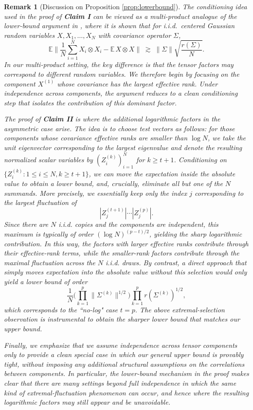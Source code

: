 \documentclass[numbers,webpdf,imaiai]{ima-authoring-template}
\theoremstyle{thmstyletwo}%
\newtheorem{remark}{Remark}%
\numberwithin{equation}{section}
\numberwithin{equation}{section}
\newcommand{\E}{\mathbb{E}}
\begin{document}
\begin{remark}[Discussion on Proposition \ref{prop:lowerbound}]\label{rem:lower_bound}
The conditioning idea used in the proof of \emph{\textbf{Claim I}} can be viewed as a multi-product analogue of the lower-bound argument in \cite[Theorem~4]{koltchinskii2017concentration}, where it is shown that for i.i.d.\ centered Gaussian random variables $X,X_1,\ldots,X_N$ with covariance operator $\Sigma$,
\[
\E \bigg\|\frac{1}{N}\sum_{i=1}^{N} X_i \otimes X_i- \E\, X \otimes X\bigg\|
\;\gtrsim\;
\|\Sigma\|\sqrt{\frac{r(\Sigma)}{N}}.
\]
In our multi-product setting, the key difference is that the tensor factors may correspond to different random variables. We therefore begin by focusing on the component $X^{(1)}$ whose covariance has the largest effective rank. Under independence across components, the argument reduces to a clean conditioning step that isolates the contribution of this dominant factor.

The proof of \emph{\textbf{Claim II}} is where the additional logarithmic factors in the asymmetric case arise. The idea is to choose test vectors as follows: for those components whose covariance effective ranks are smaller than $\log N$, we take the unit eigenvector corresponding to the largest eigenvalue and denote the resulting normalized scalar variables by $(Z_i^{(k)})_{i=1}^{N}$ for $ k\ge t+1$. Conditioning on $\{Z_i^{(k)}:1\le i\le N,k\ge t+1\}$, we can move the expectation inside the absolute value to obtain a lower bound, and, crucially, eliminate all but one of the $N$ summands. More precisely, we essentially keep only the index $j$ corresponding to the largest fluctuation of
\[
|Z_j^{(t+1)}|\cdots |Z_j^{(p)}|.
\]
Since there are  $N$ i.i.d. copies and the components are independent, this maximum is typically of order $(\log N)^{(p-t)/2}$, yielding the sharp logarithmic contribution. In this way, the factors with larger effective ranks contribute through their effective-rank terms, while the smaller-rank factors contribute through the maximal fluctuation across the $N$ i.i.d. draws. By contrast, a direct approach that simply moves expectation into the absolute value without this selection would only yield a lower bound of order
\[
\frac{1}{N}\bigg(\prod_{k=1}^p\|\Sigma^{(k)}\|^{1/2}\bigg)\prod_{k=1}^{p} r(\Sigma^{(k)})^{1/2},
\]
which corresponds to the ``no-log" case $t=p$. The above extremal-selection observation is instrumental to obtain the sharper lower bound that matches our upper bound.

Finally, we emphasize that we assume independence across tensor components only to provide a clean special case in which our general upper bound is provably tight, without imposing any additional structural assumptions on the correlations between components. In particular, the lower-bound mechanism in the proof makes clear that there are many settings beyond full independence in which the same kind of extremal-fluctuation phenomenon can occur, and hence where the resulting logarithmic factors may still appear and be unavoidable.
\end{remark}
\end{document}
